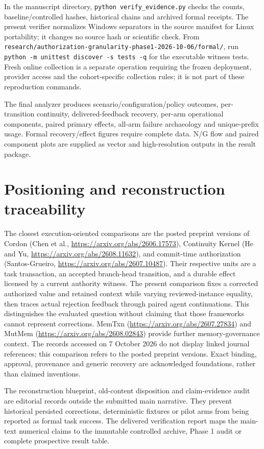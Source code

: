 \documentclass[11pt,a4paper]{article}
\newcommand{\code}[1]{\nolinkurl{#1}}
\begin{document}
In the manuscript directory, \texttt{python verify\_evidence.py} checks the counts, baseline/controlled hashes, historical chains and archived formal receipts. The present verifier normalizes Windows separators in the source manifest for Linux portability; it changes no source hash or scientific check. From \code{research/authorization-granularity-phase1-2026-10-06/formal/}, run \texttt{python -m unittest discover -s tests -q} for the executable witness tests. Fresh online collection is a separate operation requiring the frozen deployment, provider access and the cohort-specific collection rules; it is not part of these reproduction commands.

The final analyzer produces scenario/configuration/policy outcomes, per-transition continuity, delivered-feedback recovery, per-arm operational components, paired primary effects, all-arm failure archaeology and unique-prefix usage. Formal recovery/effect figures require complete data. N/G flow and paired component plots are supplied as vector and high-resolution outputs in the result package.

\section{Positioning and reconstruction traceability}
The closest execution-oriented comparisons are the posted preprint versions of Cordon (Chen et al., \url{https://arxiv.org/abs/2606.17573}), Continuity Kernel (He and Yu, \url{https://arxiv.org/abs/2608.11632}), and commit-time authorization (Santos-Grueiro, \url{https://arxiv.org/abs/2607.10487}). Their respective units are a task transaction, an accepted branch-head transition, and a durable effect licensed by a current authority witness. The present comparison fixes a corrected authorized value and retained context while varying reviewed-instance equality, then traces actual rejection feedback through paired agent continuations. This distinguishes the evaluated question without claiming that those frameworks cannot represent corrections. MemTxn (\url{https://arxiv.org/abs/2607.27834}) and MutMem (\url{https://arxiv.org/abs/2608.02843}) provide further memory-governance context. The records accessed on 7 October 2026 do not display linked journal references; this comparison refers to the posted preprint versions. Exact binding, approval, provenance and generic recovery are acknowledged foundations, rather than claimed inventions.

The reconstruction blueprint, old-content disposition and claim-evidence audit are editorial records outside the submitted main narrative. They prevent historical persisted corrections, deterministic fixtures or pilot arms from being reported as formal task success. The delivered verification report maps the main-text numerical claims to the immutable controlled archive, Phase 1 audit or complete prospective result table.
\end{document}

